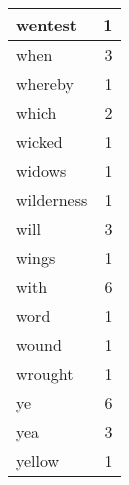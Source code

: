 \begin{center}
\begin{longtable}{l|r}
wentest & 1 \\ \hline
when & 3 \\ \hline
whereby & 1 \\ \hline
which & 2 \\ \hline
wicked & 1 \\ \hline
widows & 1 \\ \hline
wilderness & 1 \\ \hline
will & 3 \\ \hline
wings & 1 \\ \hline
with & 6 \\ \hline
word & 1 \\ \hline
wound & 1 \\ \hline
wrought & 1 \\ \hline
ye & 6 \\ \hline
yea & 3 \\ \hline
yellow & 1 \\ \hline
\end{longtable}
\end{center}



\normalsize



